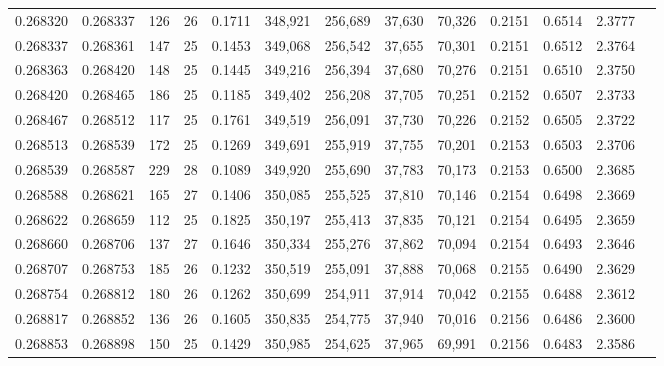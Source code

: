 \begin{tabular}{rrrrrrrrrrrrr}
0.268320 & 0.268337 &   126 &  26 &                                     0.1711 & 348,921 & 256,689 &  37,630 &  70,326 & 0.2151 & 0.6514 & 2.3777 \\
0.268337 & 0.268361 &   147 &  25 &                                     0.1453 & 349,068 & 256,542 &  37,655 &  70,301 & 0.2151 & 0.6512 & 2.3764 \\
0.268363 & 0.268420 &   148 &  25 &                                     0.1445 & 349,216 & 256,394 &  37,680 &  70,276 & 0.2151 & 0.6510 & 2.3750 \\
0.268420 & 0.268465 &   186 &  25 &                                     0.1185 & 349,402 & 256,208 &  37,705 &  70,251 & 0.2152 & 0.6507 & 2.3733 \\
0.268467 & 0.268512 &   117 &  25 &                                     0.1761 & 349,519 & 256,091 &  37,730 &  70,226 & 0.2152 & 0.6505 & 2.3722 \\
0.268513 & 0.268539 &   172 &  25 &                                     0.1269 & 349,691 & 255,919 &  37,755 &  70,201 & 0.2153 & 0.6503 & 2.3706 \\
0.268539 & 0.268587 &   229 &  28 &                                     0.1089 & 349,920 & 255,690 &  37,783 &  70,173 & 0.2153 & 0.6500 & 2.3685 \\
0.268588 & 0.268621 &   165 &  27 &                                     0.1406 & 350,085 & 255,525 &  37,810 &  70,146 & 0.2154 & 0.6498 & 2.3669 \\
0.268622 & 0.268659 &   112 &  25 &                                     0.1825 & 350,197 & 255,413 &  37,835 &  70,121 & 0.2154 & 0.6495 & 2.3659 \\
0.268660 & 0.268706 &   137 &  27 &                                     0.1646 & 350,334 & 255,276 &  37,862 &  70,094 & 0.2154 & 0.6493 & 2.3646 \\
0.268707 & 0.268753 &   185 &  26 &                                     0.1232 & 350,519 & 255,091 &  37,888 &  70,068 & 0.2155 & 0.6490 & 2.3629 \\
0.268754 & 0.268812 &   180 &  26 &                                     0.1262 & 350,699 & 254,911 &  37,914 &  70,042 & 0.2155 & 0.6488 & 2.3612 \\
0.268817 & 0.268852 &   136 &  26 &                                     0.1605 & 350,835 & 254,775 &  37,940 &  70,016 & 0.2156 & 0.6486 & 2.3600 \\
0.268853 & 0.268898 &   150 &  25 &                                     0.1429 & 350,985 & 254,625 &  37,965 &  69,991 & 0.2156 & 0.6483 & 2.3586 \\

\end{tabular}
